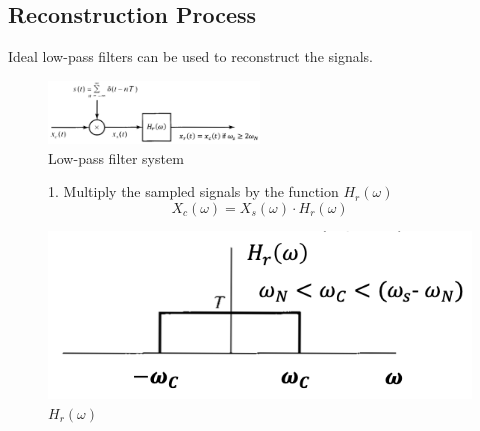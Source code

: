 \documentclass[12pt,a4paper]{article}
\begin{document}
\subsection{Reconstruction Process}
Ideal low-pass filters can be used to reconstruct the signals.
\begin{figure}[H]\centering
\includegraphics[width = 0.5\textwidth]{images/lowpass}
\caption{Low-pass filter system} \end{figure}

\begin{figure}[H]
\begin{minipage}{0.6\textwidth}
1. Multiply the sampled signals by the function $H_{r}(\omega)$ \\
\[ X_{c}(\omega) = X_{s}(\omega) \cdot H_{r}(\omega) \]
\end{minipage} \hfill
\begin{minipage}{0.5\textwidth}
\includegraphics[width = \textwidth]{images/homega}
\caption{$H_{r}(\omega)$}
\end{minipage}\end{figure}
\end{document}
